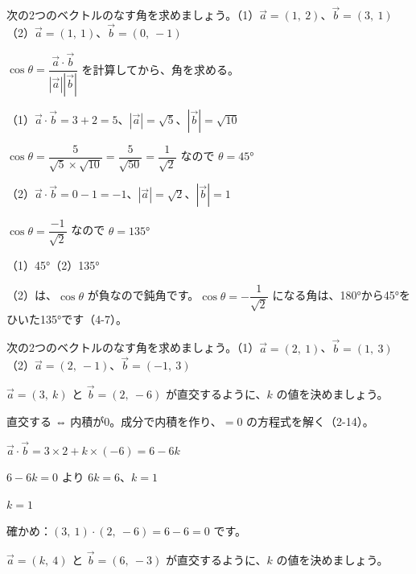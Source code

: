 \begin{reidai}[なす角を求める]
次の2つのベクトルのなす角を求めましょう。\quad（1）$\vec{a}=(1,\ 2)$、$\vec{b}=(3,\ 1)$\quad（2）$\vec{a}=(1,\ 1)$、$\vec{b}=(0,\ -1)$\par
\kangaekata $\cos\theta=\dfrac{\vec{a}\cdot\vec{b}}{|\vec{a}||\vec{b}|}$ を計算してから、角を求める。\par
\shiki（1）$\vec{a}\cdot\vec{b}=3+2=5$、$|\vec{a}|=\sqrt5$、$|\vec{b}|=\sqrt{10}$\par
\hspace*{4.6\zw}$\cos\theta=\dfrac{5}{\sqrt5\times\sqrt{10}}=\dfrac{5}{\sqrt{50}}=\dfrac{1}{\sqrt2}$ なので $\theta=45°$\par
\hspace*{2.6\zw}（2）$\vec{a}\cdot\vec{b}=0-1=-1$、$|\vec{a}|=\sqrt2$、$|\vec{b}|=1$\par
\hspace*{4.6\zw}$\cos\theta=\dfrac{-1}{\sqrt2}$ なので $\theta=135°$\par
\kotae （1）45°\quad（2）135°
\end{reidai}
（2）は、$\cos\theta$ が負なので鈍角です。$\cos\theta=-\dfrac{1}{\sqrt2}$ になる角は、180°から45°をひいた135°です（4-7）。

\begin{jibun}
次の2つのベクトルのなす角を求めましょう。\quad（1）$\vec{a}=(2,\ 1)$、$\vec{b}=(1,\ 3)$\quad（2）$\vec{a}=(2,\ -1)$、$\vec{b}=(-1,\ 3)$
\end{jibun}

\begin{reidai}[直交する条件]
$\vec{a}=(3,\ k)$ と $\vec{b}=(2,\ -6)$ が直交するように、$k$ の値を決めましょう。\par
\kangaekata 直交する ⇔ 内積が0。成分で内積を作り、$=0$ の方程式を解く（2-14）。\par
\shiki $\vec{a}\cdot\vec{b}=3\times2+k\times(-6)=6-6k$\par
\hspace*{2.6\zw}$6-6k=0$ より $6k=6$、$k=1$\par
\kotae $k=1$
\end{reidai}
確かめ：$(3,\ 1)\cdot(2,\ -6)=6-6=0$ です。

\begin{jibun}
$\vec{a}=(k,\ 4)$ と $\vec{b}=(6,\ -3)$ が直交するように、$k$ の値を決めましょう。
\end{jibun}

